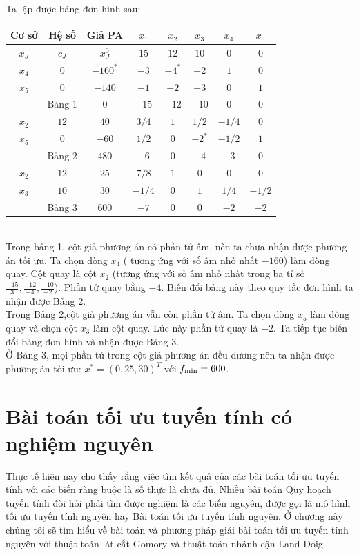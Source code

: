 \documentclass[12pt,a4paper]{report}
\begin{document}
\begin{itemize}
    Ta lập được bảng đơn hình sau:\\
    \begin{tabular}{|c|c|c|c|c|c|c|c|}
       \hline
       Cơ sở  & Hệ số & Giả PA& $x_1$ & $x_2$ & $x_3$ &$x_4$ & $x_5$ \\
       \hline
        $x_J$ & $c_J$ & $x_J^0$ & $15$ &$12$ &$10$ &$0$ &$0$ \\
        \hline
        $x_4$ & $0$ & $-160^*$ & $-3$ &$-4^*$ &$-2$ &$1$ &$0$\\
        $x_5$ & $0$ & $-140$ &$-1$ &$-2$ &$-3$ &$0$ &$1$\\
        \hline
        &Bảng 1 & $0$ & $-15$ &$-12$ &$-10$ &$0$ &$0$\\
        \hline
        $x_2$& $12$ &$40$ & $3/4$ &$1$ &$1/2$ &$-1/4$ &$0$\\
        $x_5$ &$0$ & $-60$ &$1/2$ &$0$ &$-2^*$ &$-1/2$ &$1$\\
        \hline
        &Bảng 2& $480$ &$-6$ &$0$ &$-4$ &$-3$ &$0$\\
        \hline
        $x_2$ &$12$ &$25$ &$7/8$ & $1$ &$0$ &$0 $ &$0$\\
        $x_3$ &$10$ &$30$ &$-1/4$ &$0$ &$1$ &$1/4$ &$-1/2$\\
        \hline
        &Bảng 3& $600$ &$-7$ &$0 $ &$0$ &$-2$ &$-2$\\
        \hline
    \end{tabular}\\
      Trong bảng 1, cột giả phương án có phần tử âm, nên ta chưa nhận được phương án tối ưu. Ta chọn dòng $x_4$  ( tương ứng với số âm nhỏ nhất $-160$) làm dòng quay. Cột quay là cột $x_2$ (tương ứng với số âm nhỏ nhất trong ba tỉ số $\frac{-15}{3},\frac{-12}{-4},\frac{-10}{-2}$). Phần tử quay bằng $-4$. Biến đổi bảng này theo quy tắc đơn hình ta nhận được Bảng 2.\\
    Trong Bảng 2,cột giả phương án vẫn còn phần tử âm. Ta chọn dòng $x_5$ làm dòng quay và chọn cột $x_3$ làm cột quay. Lúc này phần tử quay là $-2$. Ta tiếp tục biến đổi bảng đơn hình và nhận được Bảng 3. \\
    Ở Bảng 3, mọi phần tử trong cột giả phương án đều dương nên ta nhận được phương án tối ưu: $x^*=(0,25,30)^T$ với $f_{\rm{min}}=600$.\\
    
\end{itemize}



\chapter{Bài toán tối ưu tuyến tính có nghiệm nguyên}
Thực tế hiện nay cho thấy rằng việc tìm kết quả của các bài toán tối ưu tuyến tính với các biến ràng buộc là số thực là chưa đủ. Nhiều bài toán Quy hoạch tuyến tính đòi hỏi phải tìm được nghiệm là các biến nguyên, được gọi là mô hình tối ưu tuyến tính nguyên hay Bài toán tối ưu tuyến tính nguyên. Ở chương này chúng tôi sẽ tìm hiểu về bài toán và phương pháp giải bài toán tối ưu tuyến tính nguyên với  thuật toán lát cắt Gomory và thuật toán nhánh cận Land-Doig.
\end{document}

